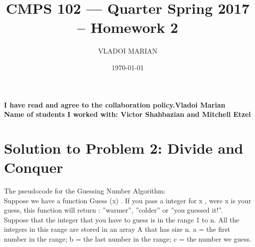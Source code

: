 \documentclass[11 pt]{article}
\title{ CMPS 102 --- Quarter  Spring 2017 --  Homework 2}
\author{VLADOI MARIAN}
\date{\today}
\begin{document}
\maketitle



\begin{center}
{\bf I have read and agree to the collaboration policy.Vladoi Marian}\\
{\bf Name of students I worked with: Victor Shahbazian and Mitchell Etzel }

\end{center}


\section*{Solution to Problem 2: Divide and Conquer}

The pseudocode  for the Guessing Number Algorithm:\\
Suppose we have a function Guess (x) . If you pass a integer for x , were x is your guess, this function will return :  ”warmer”, ”colder” or ”you guessed it!”.\\
Suppose that the integer that you have to guess is in the range 1 to n. All the integers in this range are stored in an array A that has size n. 
a = the first number in the range; 
b = the last number in the range; 
c = the number we guess.
\end{document}
